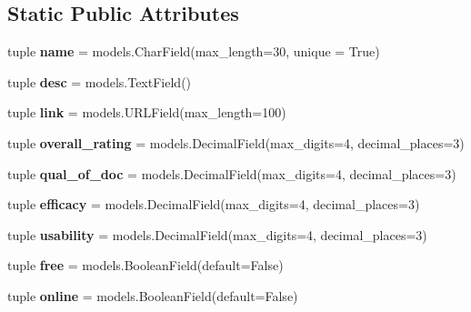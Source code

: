 \subsection*{Static Public Attributes}
\begin{DoxyCompactItemize}
\item 
\hypertarget{classratings_1_1models_1_1Tool_ad7e6ebee671f9b4145dd123d76e5c962}{tuple {\bfseries name} = models.\-Char\-Field(max\-\_\-length=30, unique = True)}\label{classratings_1_1models_1_1Tool_ad7e6ebee671f9b4145dd123d76e5c962}

\item 
\hypertarget{classratings_1_1models_1_1Tool_a5ec493b5bd4afd861a83a66db0847030}{tuple {\bfseries desc} = models.\-Text\-Field()}\label{classratings_1_1models_1_1Tool_a5ec493b5bd4afd861a83a66db0847030}

\item 
\hypertarget{classratings_1_1models_1_1Tool_a299f46aea6d493df3bb5f6eff3026883}{tuple {\bfseries link} = models.\-U\-R\-L\-Field(max\-\_\-length=100)}\label{classratings_1_1models_1_1Tool_a299f46aea6d493df3bb5f6eff3026883}

\item 
\hypertarget{classratings_1_1models_1_1Tool_a2c589f3883eacc0fa48d35a829794d16}{tuple {\bfseries overall\-\_\-rating} = models.\-Decimal\-Field(max\-\_\-digits=4, decimal\-\_\-places=3)}\label{classratings_1_1models_1_1Tool_a2c589f3883eacc0fa48d35a829794d16}

\item 
\hypertarget{classratings_1_1models_1_1Tool_ade202b8bd31fefd0044c2967c02fa39e}{tuple {\bfseries qual\-\_\-of\-\_\-doc} = models.\-Decimal\-Field(max\-\_\-digits=4, decimal\-\_\-places=3)}\label{classratings_1_1models_1_1Tool_ade202b8bd31fefd0044c2967c02fa39e}

\item 
\hypertarget{classratings_1_1models_1_1Tool_ac9bd0bd88e124f61ecb4573f5706cdcb}{tuple {\bfseries efficacy} = models.\-Decimal\-Field(max\-\_\-digits=4, decimal\-\_\-places=3)}\label{classratings_1_1models_1_1Tool_ac9bd0bd88e124f61ecb4573f5706cdcb}

\item 
\hypertarget{classratings_1_1models_1_1Tool_a067bdd59eb8dc016c81389ebd88de0d3}{tuple {\bfseries usability} = models.\-Decimal\-Field(max\-\_\-digits=4, decimal\-\_\-places=3)}\label{classratings_1_1models_1_1Tool_a067bdd59eb8dc016c81389ebd88de0d3}

\item 
\hypertarget{classratings_1_1models_1_1Tool_adb37e2c651865f5231b810ef0a6b03da}{tuple {\bfseries free} = models.\-Boolean\-Field(default=False)}\label{classratings_1_1models_1_1Tool_adb37e2c651865f5231b810ef0a6b03da}

\item 
\hypertarget{classratings_1_1models_1_1Tool_afd85b4aad531988e7ec52d2be2a03b0c}{tuple {\bfseries online} = models.\-Boolean\-Field(default=False)}\label{classratings_1_1models_1_1Tool_afd85b4aad531988e7ec52d2be2a03b0c}

\end{DoxyCompactItemize}



